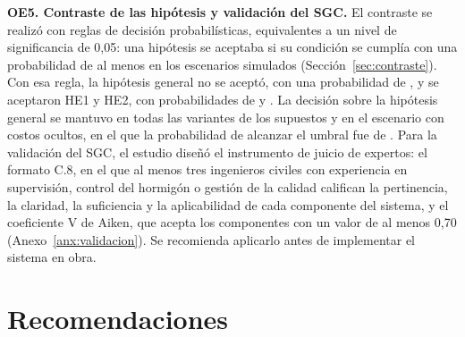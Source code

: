\textbf{OE5. Contraste de las hipótesis y validación del SGC.} El contraste se realizó con reglas de decisión probabilísticas, equivalentes a un nivel de significancia de 0,05: una hipótesis se aceptaba si su condición se cumplía con una probabilidad de al menos \MCconf{} en los escenarios simulados (Sección~\ref{sec:contraste}). Con esa regla, la hipótesis general no se aceptó, con una probabilidad de \PHG{}, y se aceptaron HE1 y HE2, con probabilidades de \PHEuno{} y \PHEdos{}. La decisión sobre la hipótesis general se mantuvo en todas las variantes de los supuestos y en el escenario con costos ocultos, en el que la probabilidad de alcanzar el umbral fue de \PHGocultos{}. Para la validación del SGC, el estudio diseñó el instrumento de juicio de expertos: el formato C.8, en el que al menos tres ingenieros civiles con experiencia en supervisión, control del hormigón o gestión de la calidad califican la pertinencia, la claridad, la suficiencia y la aplicabilidad de cada componente del sistema, y el coeficiente V de Aiken, que acepta los componentes con un valor de al menos 0,70 (Anexo~\ref{anx:validacion}). Se recomienda aplicarlo antes de implementar el sistema en obra.

\section{Recomendaciones}

